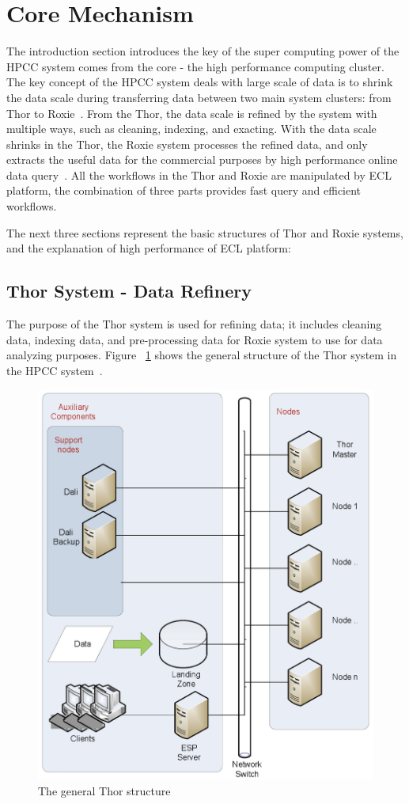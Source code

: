 \section{Core Mechanism}
The introduction section introduces the key of the super computing power of the HPCC system comes from the core - the high performance computing cluster. The key concept of the HPCC system deals with large scale of data is to shrink the data scale during transferring data between two main system clusters: from Thor to Roxie~\cite{CM1}. From the Thor, the data scale is refined by the system with multiple ways, such as cleaning, indexing, and exacting. With the data scale shrinks in the Thor, the Roxie system processes the refined data, and only extracts the useful data for the commercial purposes by high performance online data query~\cite{Intro3}. All the workflows in the Thor and Roxie are manipulated by ECL platform, the combination of three parts provides fast query and efficient workflows.

The next three sections represent the basic structures of Thor and Roxie systems, and the explanation of high performance of ECL platform:

\subsection{Thor System - Data Refinery}
The purpose of the Thor system is used for refining data; it includes cleaning data, indexing data, and pre-processing data for Roxie system to use for data analyzing purposes. Figure ~\ref{f:thor} shows the general structure of the Thor system in the HPCC system~\cite{Intro4}.

\begin{figure}[!ht]
\centering\includegraphics[width=\columnwidth]{images/thor.png}
\caption{The general Thor structure}\label{f:thor}
\end{figure}

